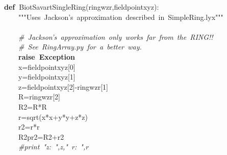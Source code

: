 \documentclass{article}
\newcommand{\hlstd}[1]{\textcolor[rgb]{0,0,0}{#1}}
\newcommand{\hlnum}[1]{\textcolor[rgb]{0.16,0.16,1}{#1}}
\newcommand{\hlstr}[1]{\textcolor[rgb]{1,0,0}{#1}}
\newcommand{\hlslc}[1]{\textcolor[rgb]{0.51,0.51,0.51}{\it{#1}}}
\newcommand{\hlsym}[1]{\textcolor[rgb]{0,0,0}{#1}}
\newcommand{\hlkwa}[1]{\textcolor[rgb]{0,0,0}{\bf{#1}}}
\newcommand{\hlkwc}[1]{\textcolor[rgb]{0,0,0}{\bf{#1}}}
\newcommand{\hlkwd}[1]{\textcolor[rgb]{0,0,0.51}{#1}}
\begin{document}
\hlkwa{def\ }\hlstd{}\hlkwd{\textunderscore Biot\textunderscore Savart\textunderscore SingleRing}\hlstd{}\hlsym{(}\hlstd{ring\textunderscore wzr}\hlsym{,}\hlstd{fieldpoint\textunderscore xyz}\hlsym{):}\hspace*{\fill}\\
\hlstd{}\hlstd{\ \ \ \ }\hlstd{}\hlstr{"""Uses\ Jackson's\ approximation\ described\ in\ SimpleRing.lyx"""}\hlstd{\hspace*{\fill}\\
\hspace*{\fill}\\
}\hlstd{\ \ \ \ }\hlstd{}\hlslc{\#\ Jackson's\ approximation\ only\ works\ far\ from\ the\ RING!!}\hspace*{\fill}\\
\hlstd{}\hlstd{\ \ \ \ }\hlstd{}\hlslc{\#\ See\ RingArray.py\ for\ a\ better\ way.}\hspace*{\fill}\\
\hlstd{}\hlstd{\ \ \ \ }\hlstd{}\hlkwa{raise\ }\hlstd{}\hlkwc{Exception}\hspace*{\fill}\\
\hlstd{}\hlstd{\ \ \ \ }\hlstd{x}\hlsym{=}\hlstd{fieldpoint\textunderscore xyz}\hlsym{{[}}\hlstd{}\hlnum{0}\hlstd{}\hlsym{{]}}\hspace*{\fill}\\
\hlstd{}\hlstd{\ \ \ \ }\hlstd{y}\hlsym{=}\hlstd{fieldpoint\textunderscore xyz}\hlsym{{[}}\hlstd{}\hlnum{1}\hlstd{}\hlsym{{]}}\hspace*{\fill}\\
\hlstd{}\hlstd{\ \ \ \ }\hlstd{z}\hlsym{=}\hlstd{fieldpoint\textunderscore xyz}\hlsym{{[}}\hlstd{}\hlnum{2}\hlstd{}\hlsym{{]}{-}}\hlstd{ring\textunderscore wzr}\hlsym{{[}}\hlstd{}\hlnum{1}\hlstd{}\hlsym{{]}}\hspace*{\fill}\\
\hlstd{}\hlstd{\ \ \ \ }\hlstd{R}\hlsym{=}\hlstd{ring\textunderscore wzr}\hlsym{{[}}\hlstd{}\hlnum{2}\hlstd{}\hlsym{{]}}\hspace*{\fill}\\
\hlstd{}\hlstd{\ \ \ \ }\hlstd{R2}\hlsym{=}\hlstd{R}\hlsym{{*}}\hlstd{R\hspace*{\fill}\\
}\hlstd{\ \ \ \ }\hlstd{r}\hlsym{=}\hlstd{}\hlkwd{sqrt}\hlstd{}\hlsym{(}\hlstd{x}\hlsym{{*}}\hlstd{x}\hlsym{+}\hlstd{y}\hlsym{{*}}\hlstd{y}\hlsym{+}\hlstd{z}\hlsym{{*}}\hlstd{z}\hlsym{)}\hspace*{\fill}\\
\hlstd{}\hlstd{\ \ \ \ }\hlstd{r2}\hlsym{=}\hlstd{r}\hlsym{{*}}\hlstd{r\hspace*{\fill}\\
}\hlstd{\ \ \ \ }\hlstd{R2pr2}\hlsym{=}\hlstd{R2}\hlsym{+}\hlstd{r2\hspace*{\fill}\\
}\hlstd{\ \ \ \ }\hlstd{}\hlslc{\#print\ "z:\ ",z,"\ r:\ ",r}\hspace*{\fill}\\
\end{document}
